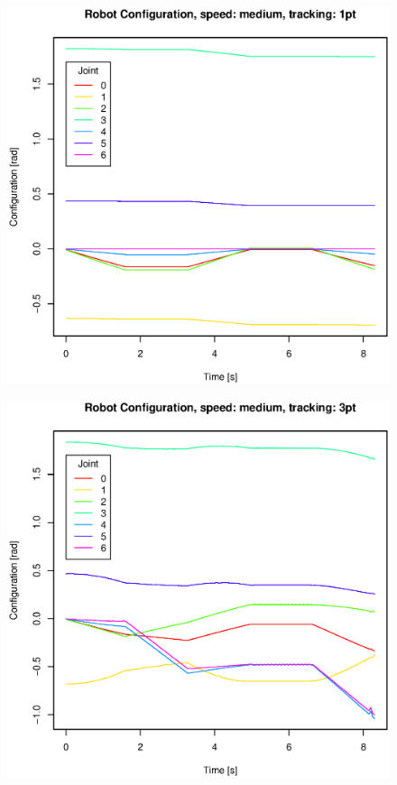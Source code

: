\begin{figure}[H]
\centering
\includegraphics[width= \linewidth]{graphics/robotics/robotConfiguration_medium_1pt}
\caption{}
\label{fig:}
\end{figure}

\begin{figure}[H]
\centering
\includegraphics[width= \linewidth]{graphics/robotics/robotConfiguration_medium_3pt}
\caption{}
\label{fig:}
\end{figure}

